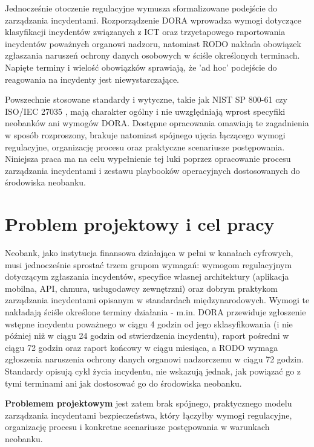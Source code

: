 Jednocześnie otoczenie regulacyjne wymusza sformalizowane podejście do zarządzania incydentami. Rozporządzenie DORA \cite{dora2022} wprowadza wymogi dotyczące klasyfikacji incydentów związanych z ICT oraz trzyetapowego raportowania incydentów poważnych organowi nadzoru, natomiast RODO \cite{rodo2016} nakłada obowiązek zgłaszania naruszeń ochrony danych osobowych w ściśle określonych terminach. Napięte terminy i wielość obowiązków sprawiają, że 'ad hoc' podejście do reagowania na incydenty jest niewystarczające.

Powszechnie stosowane standardy i wytyczne, takie jak NIST SP 800-61 \cite{nist800-61r2} czy ISO/IEC 27035 \cite{iso27035-2}, mają charakter ogólny i nie uwzględniają wprost specyfiki neobanków ani wymogów DORA. Dostępne opracowania omawiają te zagadnienia w sposób rozproszony, brakuje natomiast spójnego ujęcia łączącego wymogi regulacyjne, organizację procesu oraz praktyczne scenariusze postępowania. Niniejsza praca ma na celu wypełnienie tej luki poprzez opracowanie procesu zarządzania incydentami i zestawu playbooków operacyjnych dostosowanych do środowiska neobanku.

\section{Problem projektowy i cel pracy}\label{sec:problem-cel}
Neobank, jako instytucja finansowa działająca w pełni w kanałach cyfrowych, musi jednocześnie sprostać trzem grupom wymagań: wymogom regulacyjnym dotyczącym zgłaszania incydentów, specyfice własnej architektury (aplikacja mobilna, API, chmura, usługodawcy zewnętrzni) oraz dobrym praktykom zarządzania incydentami opisanym w standardach międzynarodowych. Wymogi te nakładają ściśle określone terminy działania - m.in. DORA \cite{dora2022} przewiduje zgłoszenie wstępne incydentu poważnego w ciągu 4 godzin od jego sklasyfikowania (i nie później niż w ciągu 24 godzin od stwierdzenia incydentu), raport pośredni w ciągu 72 godzin oraz raport końcowy w ciągu miesiąca, a RODO \cite{rodo2016} wymaga zgłoszenia naruszenia ochrony danych organowi nadzorczemu w ciągu 72 godzin. Standardy opisują cykl życia incydentu, nie wskazują jednak, jak powiązać go z tymi terminami ani jak dostosować go do środowiska neobanku.

\textbf{Problemem projektowym} jest zatem brak spójnego, praktycznego modelu zarządzania incydentami bezpieczeństwa, który łączyłby wymogi regulacyjne, organizację procesu i konkretne scenariusze postępowania w warunkach neobanku.

